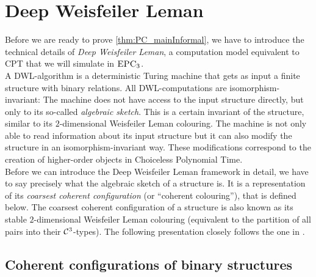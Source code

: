 \documentclass[a4paper,UKenglish,cleveref, autoref, thm-restate]{lipics-v2021}
\newcommand{\EPC}{\mbox{\sc EPC}}
\newcommand{\Cc}{{\cal C}}
\begin{document}
	\section{Deep Weisfeiler Leman}
	\label{sec:dwl}
	Before we are ready to prove \autoref{thm:PC_mainInformal}, we have to introduce the technical details of \emph{Deep Weisfeiler Leman}, a computation model equivalent to CPT that we will simulate in $\EPC_3$.\\
	A DWL-algorithm is a deterministic Turing machine that gets as input a finite structure with binary relations. All DWL-computations are isomorphism-invariant: The machine does not have access to the input structure directly, but only to its so-called \emph{algebraic sketch}. This is a certain invariant of the structure, similar to its $2$-dimensional Weisfeiler Leman colouring. The machine is not only able to read information about its input structure but it can also modify the structure in an isomorphism-invariant way. These modifications correspond to the creation of higher-order objects in Choiceless Polynomial Time.\\
	Before we can introduce the Deep Weisfeiler Leman framework in detail, we have to say precisely what the algebraic sketch of a structure is. It is a representation of its \emph{coarsest coherent configuration} (or ``coherent colouring''), that is defined below. The coarsest coherent configuration of a structure is also known as its stable $2$-dimensional Weisfeiler Leman colouring (equivalent to the partition of all pairs into their $\Cc^3$-types). 
	The following presentation closely follows the one in \cite{dwl}. 
	
	\subsection{Coherent configurations of binary structures}
	\label{sec:preliminariesDWL}
	
\end{document}

